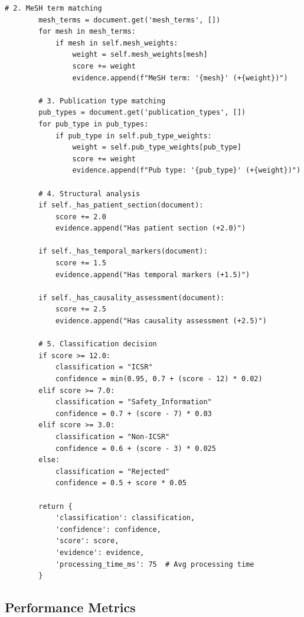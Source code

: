 \begin{lstlisting}[style=pythonstyle]
        # 2. MeSH term matching
        mesh_terms = document.get('mesh_terms', [])
        for mesh in mesh_terms:
            if mesh in self.mesh_weights:
                weight = self.mesh_weights[mesh]
                score += weight
                evidence.append(f"MeSH term: '{mesh}' (+{weight})")
        
        # 3. Publication type matching
        pub_types = document.get('publication_types', [])
        for pub_type in pub_types:
            if pub_type in self.pub_type_weights:
                weight = self.pub_type_weights[pub_type]
                score += weight
                evidence.append(f"Pub type: '{pub_type}' (+{weight})")
        
        # 4. Structural analysis
        if self._has_patient_section(document):
            score += 2.0
            evidence.append("Has patient section (+2.0)")
        
        if self._has_temporal_markers(document):
            score += 1.5
            evidence.append("Has temporal markers (+1.5)")
        
        if self._has_causality_assessment(document):
            score += 2.5
            evidence.append("Has causality assessment (+2.5)")
        
        # 5. Classification decision
        if score >= 12.0:
            classification = "ICSR"
            confidence = min(0.95, 0.7 + (score - 12) * 0.02)
        elif score >= 7.0:
            classification = "Safety_Information"
            confidence = 0.7 + (score - 7) * 0.03
        elif score >= 3.0:
            classification = "Non-ICSR"
            confidence = 0.6 + (score - 3) * 0.025
        else:
            classification = "Rejected"
            confidence = 0.5 + score * 0.05
        
        return {
            'classification': classification,
            'confidence': confidence,
            'score': score,
            'evidence': evidence,
            'processing_time_ms': 75  # Avg processing time
        }
\end{lstlisting}

\subsection{Performance Metrics}

